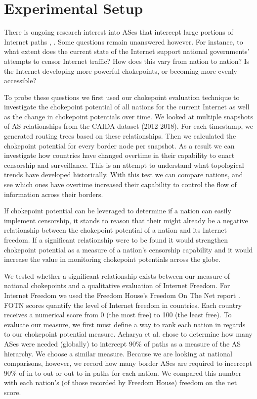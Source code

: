 \documentclass[10pt, conference, letterpaper]{IEEEtran}
\begin{document}
\section{Experimental Setup}

There is ongoing research interest into ASes that intercept large portions of Internet paths \cite{throats}, \cite{decoy}. Some questions remain unanswered however. For instance, to what
extent does the current state of the Internet support national governments' attempts to censor Internet traffic? How does this vary from nation to nation? Is the Internet developing more
powerful chokepoints, or becoming more evenly accessible?
\par
To probe these questions we first used our chokepoint evaluation technique to investigate the chokepoint potential of all nations for the current Internet as well as the
change in chokepoint potentials over time. We looked at multiple snapshots of AS relationships from the CAIDA dataset (2012-2018).
For each timestamp, we generated routing trees based on these relationships. Then we calculated the chokepoint potential for every border node per snapshot. As a result we can investigate
how countries have changed overtime in their capability to enact censorship and surveillance. This is an attempt to understand what topological trends have developed historically.
With this test we can compare nations, and see which ones have overtime increased their capability to control the flow of information across their borders.

If chokepoint potential can be leveraged to determine if a nation can easily implement censorship, it stands to reason that their might already be a negative relationship between
the chokepoint potential of a nation and its Internet freedom. If a significant relationship were to be found it would strengthen chokepoint potential as a measure of a nation's censorship capability
and it would increase the value in monitoring chokepoint potentials across the globe.
\par
We tested whether a significant relationship exists between our measure of national chokepoints and a qualitative evaluation of Internet Freedom. For Internet Freedom we used
the Freedom House's Freedom On The Net report \cite{FOTN}. FOTN scores quantify the level of Internet freedom in countries. Each country receives a numerical score from 0 (the most free)
to 100 (the least free).
 To evaluate our measure, we first must define a way to rank each nation in regards to our chokepoint potential measure.
Acharya et al. \cite{throats} chose to determine how many ASes were needed (globally) to intercept 90\% of paths as a measure of the AS hierarchy. We choose a similar measure. Because we are
looking at national comparisons, however, we record how many border ASes are required to incercept 90\% of in-to-out or out-to-in paths for each nation. We compared this number
with each nation's (of those recorded by Freedom House) freedom on the net score.
\end{document}
